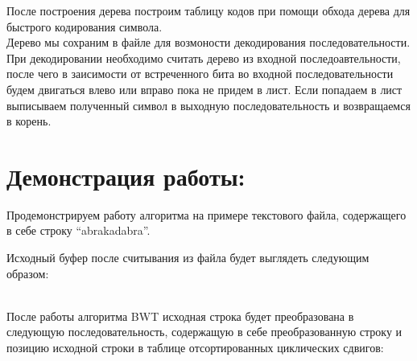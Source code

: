 После построения дерева построим таблицу кодов при помощи обхода дерева для быстрого кодирования символа. \\

Дерево мы сохраним в файле для возмоности декодирования последовательности. \\

При декодировании необходимо считать дерево из входной последоавтельности, после чего в заисимости от встреченного бита во входной последовательности будем двигаться влево или вправо пока не придем в лист. Если попадаем в лист выписываем полученный символ в выходную последовательность и возвращаемся в корень. \\

\pagebreak

\section{Демонстрация работы:}

Продемонстрируем работу алгоритма на примере текстового файла, содержащего в себе строку \enquote{abrakadabra}.

Исходный буфер после считывания из файла будет выглядеть следующим образом:

{} \\

После работы алгоритма BWT исходная строка будет преобразована в следующую последовательность, содержащую в себе преобразованную строку и позицию исходной строки в таблице отсортированных циклических сдвигов:

{}\\

